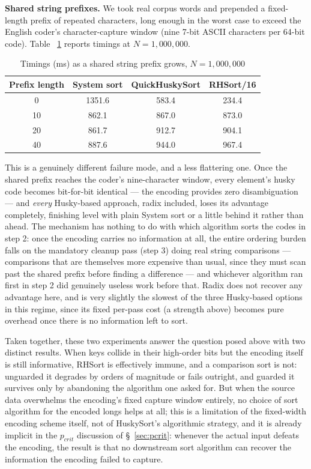\documentclass[twoside,leqno,twocolumn]{article}
\begin{document}
\textbf{Shared string prefixes.}
We took real corpus words and prepended a fixed-length prefix of repeated characters,
long enough in the worst case to exceed the English coder's character-capture window (nine 7-bit ASCII characters per 64-bit code).
Table ~\ref{tab:AdversarialPrefix} reports timings at $N = 1{,}000{,}000$.

\begin{table}
  \caption{Timings (ms) as a shared string prefix grows, $N = 1{,}000{,}000$}
  \label{tab:AdversarialPrefix}
  \begin{tabular}{cccc}
    \toprule
    Prefix length & System sort & QuickHuskySort & RHSort/16 \\
    \midrule
    0  & 1351.6 & 583.4 & 234.4 \\
    10 & 862.1 & 867.0 & 873.0 \\
    20 & 861.7 & 912.7 & 904.1 \\
    40 & 887.6 & 944.0 & 967.4 \\
    \bottomrule
  \end{tabular}
\end{table}

This is a genuinely different failure mode, and a less flattering one.
Once the shared prefix reaches the coder's nine-character window, every element's husky code becomes bit-for-bit identical —
the encoding provides zero disambiguation — and \emph{every} Husky-based approach,
radix included, loses its advantage completely,
finishing level with plain System sort or a little behind it rather than ahead.
The mechanism has nothing to do with which algorithm sorts the codes in step 2:
once the encoding carries no information at all,
the entire ordering burden falls on the mandatory cleanup pass (step 3) doing real string comparisons —
comparisons that are themselves more expensive than usual,
since they must scan past the shared prefix before finding a difference —
and whichever algorithm ran first in step 2 did genuinely useless work before that.
Radix does not recover any advantage here, and is very slightly the slowest of the three Husky-based options in this regime,
since its fixed per-pass cost (a strength above) becomes pure overhead once there is no information left to sort.

Taken together, these two experiments answer the question posed above with two distinct results.
When keys collide in their high-order bits but the encoding itself is still informative,
RHSort is effectively immune, and a comparison sort is not:
unguarded it degrades by orders of magnitude or fails outright,
and guarded it survives only by abandoning the algorithm one asked for.
But when the source data overwhelms the encoding's fixed capture window entirely, no choice of sort algorithm for the encoded longs helps at all;
this is a limitation of the fixed-width encoding scheme itself, not of HuskySort's algorithmic strategy,
and it is already implicit in the $p_{crit}$ discussion of \S~\ref{sec:pcrit}:
whenever the actual input defeats the encoding,
the result is that no downstream sort algorithm can recover the information the encoding failed to capture.
\end{document}
